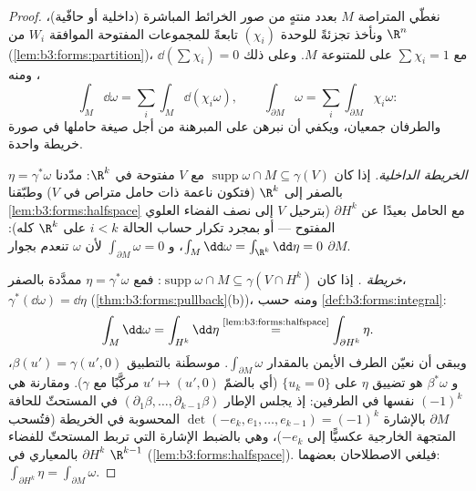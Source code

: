 \begin{proof}
نغطّي المتراصة $M$ بعدد منتهٍ من صور الخرائط المباشرة (داخلية
أو حافّية)، ونأخذ تجزئةً للوحدة $(\chi_i)$ تابعةً للمجموعات
المفتوحة الموافقة $W_i$ من $\R^n$ (\cref{lem:b3:forms:partition})، مع $\sum\chi_i
= 1$ على
 للمتنوعة $M$. وعلى ذلك  $\dd(\sum\chi_i) = 0$، ومنه
\[
\int_M\dd\omega = \sum_i\int_M\dd(\chi_i\omega),
\qquad
\int_{\partial M}\omega =
\sum_i\int_{\partial M}\chi_i\omega :
\]
والطرفان جمعيان، ويكفي أن نبرهن على المبرهنة من أجل صيغة حاملها
في صورة خريطة واحدة.

\emph{الخريطة الداخلية.} إذا كان $\operatorname{supp}\omega \cap M
\subseteq \gamma(V)$ مع $V$ مفتوحة في
$\R^k$: مدّدنا $\eta =
\gamma^*\omega$ بالصفر إلى $\R^k$ (فتكون ناعمة ذات حامل
متراص في $V$) وطبّقنا \cref{lem:b3:forms:halfspace} مع الحامل بعيدًا عن
$\partial H^k$ (بترحيل $V$ إلى نصف الفضاء العلوي المفتوح ---
أو بمجرد تكرار حساب الحالة $i < k$ على $\R^k$ كله): $\int_M\dd\omega =
\int_{\R^k}\dd\eta = 0$،
و $\int_{\partial M}\omega = 0$ لأن $\omega$ تنعدم بجوار $\partial M$.

\emph{خريطة .} إذا كان $\operatorname{supp}\omega\cap M
\subseteq \gamma(V \cap H^k)$: فمع $\eta = \gamma^*\omega$ ممدَّدة
بالصفر،
$\gamma^*(\dd\omega) = \dd\eta$
(\cref{thm:b3:forms:pullback}(b))، ومنه حسب \cref{def:b3:forms:integral}:
\[
\int_M\dd\omega = \int_{H^k}\dd\eta
\overset{\text{\cref{lem:b3:forms:halfspace}}}{=}
\int_{\partial H^k}\eta .
\]
ويبقى أن نعيّن الطرف الأيمن بالمقدار $\int_{\partial
M}\omega$.  موسطَنة
بالتطبيق $\beta(u') =
\gamma(u', 0)$، و $\beta^*\omega$ هو تضييق $\eta$ على
$\{u_k = 0\}$ (أي  بالضمّ $u'
\mapsto (u', 0)$ مركَّبًا مع
$\gamma$). ومقارنة  هي $(-1)^k$ نفسها في الطرفين: إذ
يجلس الإطار $(\partial_1\beta, \dots, \partial_{k-1}\beta)$ في  المستحثّ للحافة $\partial M$
بالإشارة $\det(-e_k, e_1, \dots, e_{k-1}) = (-1)^k$ المحسوبة في الخريطة (فتُسحب المتجهة الخارجية
عكسيًّا إلى $-e_k$)، وهي بالضبط الإشارة التي تربط 
المستحثّ للفضاء $\partial H^k$ بالمعياري في $\R^{k-1}$
(\cref{lem:b3:forms:halfspace}). فيلغي الاصطلاحان بعضهما: $\int_{\partial H^k}\eta = \int_{\partial M}\omega$.
\end{proof}

